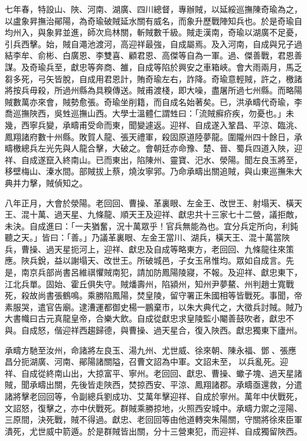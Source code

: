\begin{pinyinscope}
七年春，特設山、陜、河南、湖廣、四川總督，專辦賊，以延綏巡撫陳奇瑜為之，以盧象昇撫治鄖陽，為奇瑜破賊延水關有威名，而象升歷戰陣知兵也。於是奇瑜自均州入，與象昇並進，師次烏林關，斬賊數千級。賊走漢南，奇瑜以湖廣不足憂，引兵西擊。始，賊自澠池渡河，高迎祥最強，自成屬焉。及入河南，自成與兄子過結李牟、俞彬、白廣恩、李雙喜、顧君恩、高傑等自為一軍。過、傑善戰，君恩善謀。及奇瑜兵至，獻忠等奔商、雒，自成等陷於興安之車箱峽。會大雨兩月，馬乏芻多死，弓矢皆脫，自成用君恩計，賄奇瑜左右，詐降。奇瑜意輕賊，許之，檄諸將按兵毋殺，所過州縣為具糗傳送。賊甫渡棧，即大噪，盡屠所過七州縣。而略陽賊數萬亦來會，賊勢愈張。奇瑜坐削籍，而自成名始著矣。已，洪承疇代奇瑜，李喬巡撫陜西，吳甡巡撫山西。大學士溫體仁謂甡曰：「流賊癬疥疾，勿憂也。」未幾，西寧兵變，承疇甫受命而東，聞變遽返。迎祥、自成遂入鞏昌、平涼、臨洮、鳳翔諸府數十州縣。敗賀人龍、張天禮軍，殺固原道陸夢龍。圍隴州四十餘日，承疇檄總兵左光先與人龍合擊，大破之。會朝廷亦命豫、楚、晉、蜀兵四道入陜，迎祥、自成遂竄入終南山。已而東出，陷陳州、靈寶、汜水、滎陽。聞左良玉將至，移壁梅山、溱水間。部賊拔上蔡，燒汝寧郛。乃命承疇出關追賊，與山東巡撫朱大典并力擊，賊偵知之。

八年正月，大會於滎陽。老回回、曹操、革裏眼、左金王、改世王、射塌天、橫天王、混十萬、過天星、九條龍、順天王及迎祥、獻忠共十三家七十二營，議拒敵，未決。自成進曰：「一夫猶奮，況十萬眾乎！官兵無能為也。宜分兵定所向，利鈍聽之天。」皆曰：「善。」乃議革裏眼、左金王當川、湖兵，橫天王、混十萬當陜兵，曹操、過天星扼河上，迎祥、獻忠及自成等略東方，老回回、九條龍往來策應。陜兵銳，益以謝塌天、改世王。所破城邑，子女玉帛惟均。眾如自成言。先是，南京兵部尚書呂維祺懼賊南犯，請加防鳳陽陵寢，不報。及迎祥、獻忠東下，江北兵單。固始、霍丘俱失守。賊燔壽州，陷潁州，知州尹夢鰲、州判趙士寬戰死，殺故尚書張鶴鳴。乘勝陷鳳陽，焚皇陵，留守署正朱國相等皆戰死。事聞，帝素服哭，遣官告廟。逮漕運都御史楊一鵬棄市，以朱大典代之，大徵兵討賊。賊乃大書幟曰古元真龍皇帝，合樂大飲。自成從獻忠求皇陵監小閹善鼓吹者，獻忠不與。自成怒，偕迎祥西趨歸德，與曹操、過天星合，復入陜西。獻忠獨東下廬州。

承疇方馳至汝州，命諸將左良玉、湯九州、尤世威、徐來朝、陳永福、鄧、張應昌分扼湖廣、河南、鄖陽諸關隘，召曹文詔為中軍。文詔未至，以兵亂死。迎祥、自成從終南山出，大掠富平、寧州。老回回、獻忠、曹操、蠍子塊、過天星諸賊，聞承疇出關，先後皆走陜西，焚掠西安、平涼、鳳翔諸郡。承疇亟還救，分遣諸將擊老回回等，令副總兵劉成功、艾萬年擊迎祥、自成於寧州。萬年中伏戰死，文詔怒，復擊之，亦中伏戰死。群賊乘勝掠地，火照西安城中。承疇力禦之涇陽、三原間，決死戰，賊不得過。獻忠、老回回等由他道轉突朱陽關，守關將徐來臣軍潰死，尤世威中箭遁。於是群賊皆出關，分十三營東犯，而迎祥、自成獨留陜西。


\end{pinyinscope}
